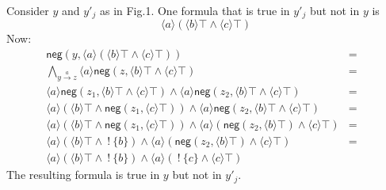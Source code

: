 \documentclass[smallextended]{svjour3}       %
\numberwithin{subcase}{mycase}
\def\fBang {\ ! \ }
\begin{document}
Consider $y$ and $y'_j$ as in Fig.1.
One formula that is true in $y'_j$ but not in $y$ is
\[
\langle a \rangle (\langle b \rangle \top \land \langle c \rangle \top)
\]
Now:
\begin{eqnarray}
\mathsf{neg}(y, \langle a \rangle (\langle b \rangle \top \land \langle c \rangle \top)) & = & \nonumber \\
\bigwedge\limits_{y \xrightarrow{a} z} \langle a \rangle \mathsf{neg}(z, \langle b \rangle \top \land \langle c \rangle \top) & = & \nonumber \\
\langle a \rangle \mathsf{neg}(z_1, \langle b \rangle \top \land \langle c \rangle \top) \land \langle a \rangle\mathsf{neg}(z_2, \langle b \rangle \top \land \langle c \rangle \top) & = & \nonumber \\
\langle a \rangle (\langle b \rangle \top \land \mathsf{neg}(z_1, \langle c \rangle \top)) \land \langle a \rangle\mathsf{neg}(z_2, \langle b \rangle \top \land \langle c \rangle \top) & = & \nonumber \\
\langle a \rangle (\langle b \rangle \top \land \mathsf{neg}(z_1, \langle c \rangle \top)) \land \langle a \rangle(\mathsf{neg}(z_2, \langle b \rangle \top) \land \langle c \rangle \top) & = & \nonumber \\
\langle a \rangle (\langle b \rangle \top \land \fBang \{b\}) \land \langle a \rangle(\mathsf{neg}(z_2, \langle b \rangle \top) \land \langle c \rangle \top) & = & \nonumber \\
\langle a \rangle (\langle b \rangle \top \land \fBang \{b\}) \land \langle a \rangle(\fBang \{c\} \land \langle c \rangle \top) & & \nonumber
\end{eqnarray}
The resulting formula is true in $y$ but not in $y'_j$.
\end{document}
